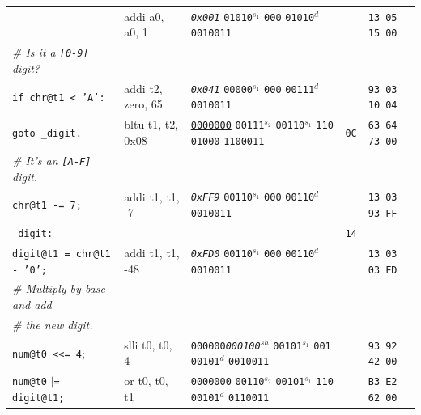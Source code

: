 \documentclass[a4paper,12pt,final]{article}
\begin{document}
\begin{table}[!htbp]
\begin{adjustwidth}{-1cm}{-1cm}
\begin{center}
\begin{tabular}{l|ll|l|l}
\hspace{1.053000em} & addi a0, a0, 1 & \emph{\texttt{0x001}}                    \texttt{01010}​\(^{s_{1}}\) \texttt{000} \texttt{01010}​\(^{d}\)  \texttt{0010011} &  & \texttt{13 05 15 00}\\[0pt]
\hspace{1.053000em} \emph{\# Is it a \texttt{[0-9]} digit?} &  &  &  & \\[0pt]
\hspace{1.053000em} \texttt{if chr@t1 < 'A':} & addi t2, zero, 65 & \emph{\texttt{0x041}}                    \texttt{00000}​\(^{s_{1}}\) \texttt{000} \texttt{00111}​\(^{d}\)  \texttt{0010011} &  & \texttt{93 03 10 04}\\[0pt]
\hspace{2.106000em}   \texttt{goto \_digit.} & bltu t1, t2, 0x08 & \uline{\texttt{0000000}} \texttt{00111}​\(^{s_{2}}\) \texttt{00110}​\(^{s_{1}}\) \texttt{110} \uline{\texttt{01000}} \texttt{1100011} & \texttt{0C} & \texttt{63 64 73 00}\\[0pt]
\hspace{1.053000em} \emph{\# It's an \texttt{[A-F]} digit.} &  &  &  & \\[0pt]
\hspace{1.053000em} \texttt{chr@t1 -= 7;} & addi t1, t1, -7 & \emph{\texttt{0xFF9}}                    \texttt{00110}​\(^{s_{1}}\) \texttt{000} \texttt{00110}​\(^{d}\)  \texttt{0010011} &  & \texttt{13 03 93 FF}\\[0pt]
\texttt{\_digit:} &  &  & \texttt{14} & \\[0pt]
\hspace{1.053000em} \texttt{digit@t1 = chr@t1 - '0';} & addi t1, t1, -48 & \emph{\texttt{0xFD0}}                    \texttt{00110}​\(^{s_{1}}\) \texttt{000} \texttt{00110}​\(^{d}\)  \texttt{0010011} &  & \texttt{13 03 03 FD}\\[0pt]
\hspace{1.053000em} \emph{\# Multiply by base and add} &  &  &  & \\[0pt]
\hspace{1.053000em} \emph{\# the new digit.} &  &  &  & \\[0pt]
\hspace{1.053000em} \texttt{num@t0 <{}<{}= 4}; & slli t0, t0, 4 & \texttt{000000}​\emph{\texttt{000100}}​\(^{sh}\)         \texttt{00101}​\(^{s_{1}}\) \texttt{001} \texttt{00101}​\(^{d}\)  \texttt{0010011} &  & \texttt{93 92 42 00}\\[0pt]
\hspace{1.053000em} \texttt{num@t0} \(\vert{}\)​\texttt{= digit@t1;} & or t0, t0, t1 & \texttt{0000000} \texttt{00110}​\(^{s_{2}}\) \texttt{00101}​\(^{s_{1}}\) \texttt{110} \texttt{00101}​\(^{d}\)  \texttt{0110011} &  & \texttt{B3 E2 62 00}\\[0pt]

\end{tabular}
\end{center}
\end{adjustwidth}
\end{table}
\end{document}
